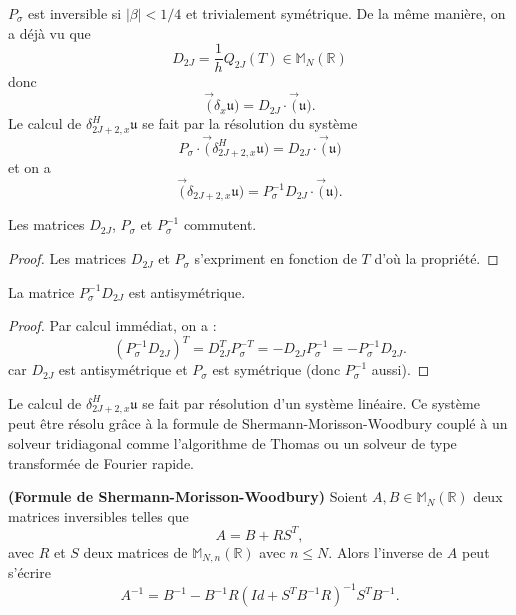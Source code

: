 $P_{\sigma}$ est inversible si $|\beta |<1/4$ et trivialement symétrique. 
De la même manière, on a déjà vu que 
\begin{equation}
D_{2J} = \dfrac{1}{h} Q_{2J}(T) \in \mathbb{M}_{N}(\mathbb{R})
\end{equation}
donc 
\begin{equation}
\vec (\delta_{x} \mathfrak{u}) = D_{2J} \cdot \vec (\mathfrak{u}).
\end{equation}
Le calcul de $\delta^H_{2J+2,x} \mathfrak{u}$ se fait par la résolution du système
\begin{equation}
P_{\sigma} \cdot \vec (\delta_{2J+2,x}^H \mathfrak{u}) = D_{2J} \cdot \vec (\mathfrak{u})
\end{equation}
et on a 
\begin{equation}
\vec (\delta_{2J+2,x} \mathfrak{u} ) =P_{\sigma}^{-1} D_{2J} \cdot \vec (\mathfrak{u}).
\end{equation}

\begin{proposition}
Les matrices $D_{2J}$, $P_{\sigma}$ et $P^{-1}_{\sigma}$ commutent.
\end{proposition}

\begin{proof}
Les matrices $D_{2J}$ et $P_{\sigma}$ s'expriment en fonction de $T$ d'où la propriété.
\end{proof}

\begin{proposition}
La matrice $P^{-1}_{\sigma}D_{2J}$ est antisymétrique.
\end{proposition}

\begin{proof}
Par calcul immédiat, on a :
\begin{equation}
(P^{-1}_{\sigma}D_{2J})^T = D_{2J}^T P_{\sigma}^{-T} = - D_{2J} P_{\sigma}^{-1} = - P_{\sigma}^{-1} D_{2J}.
\end{equation}
car $D_{2J}$ est antisymétrique et $P_{\sigma}$ est symétrique (donc $P^{-1}_{\sigma}$ aussi). 
\end{proof}

Le calcul de $\delta_{2J+2,x}^H \mathfrak{u}$ se fait par résolution d'un système linéaire. Ce système peut être résolu grâce à la formule de Shermann-Morisson-Woodbury couplé à un solveur tridiagonal comme l'algorithme de Thomas ou un solveur de type transformée de Fourier rapide.

\begin{proposition}
\textbf{(Formule de Shermann-Morisson-Woodbury)} Soient $A, B \in \mathbb{M}_N \left(\mathbb{R} \right)$ deux matrices inversibles telles que 
\begin{equation}
A = B + R S^T,
\end{equation}
avec $R$ et $S$ deux matrices de $\mathbb{M}_{N,n} \left(\mathbb{R} \right)$ avec $n \leq N$.
Alors l'inverse de $A$ peut s'écrire
\begin{equation}
A^{-1} = B^{-1} - B^{-1} R \left( Id + S^T B^{-1} R  \right)^{-1} S^T B^{-1}.
\label{eq:SMW}
\end{equation}
\end{proposition}

